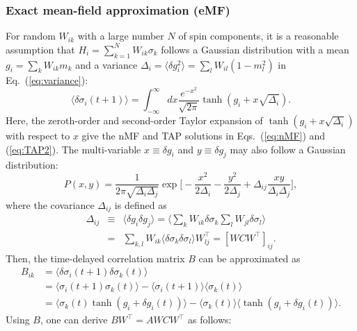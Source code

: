 \documentclass[prx,twocolumn,twoside,showpacs,superscriptaddress]{revtex4-1}
\begin{document}
\subsubsection*{Exact mean-field approximation (eMF)} 
For random $W_{ik}$ with a large number $N$ of spin components, it is a reasonable assumption that $H_i = \sum_{k=1}^N W_{ik} \sigma_k$ follows a Gaussian distribution with a mean $g_i = \sum_k W_{ik} m_k$ and a variance $\Delta_i = \langle \delta g_i^2 \rangle = \sum_l W_{il}(1-m_l^2)$ in Eq.~(\ref{eq:variance}):
\begin{equation}
\langle \delta \sigma_i(t+1) \rangle = \int_{-\infty}^{\infty} dx \frac{e^{-x^2}}{\sqrt{2 \pi}} \tanh (g_i + x \sqrt{\Delta_i}).
\end{equation}
Here, the zeroth-order and second-order Taylor expansion of $\tanh (g_i + x \sqrt{\Delta_i})$ with respect to $x$ give the nMF and TAP solutions in Eqs.~(\ref{eq:nMF}) and (\ref{eq:TAP2}).
The multi-variable $x \equiv \delta g_i$ and $y \equiv \delta g_j$ may also follow a Gaussian distribution:
\begin{equation}
P(x, y) = \frac{1}{2 \pi \sqrt{\Delta_i \Delta_j}} \exp \bigg[ - \frac{x^2}{2 \Delta_i} - \frac{y^2}{2 \Delta_j} + \Delta_{ij} \frac{xy}{\Delta_i \Delta_j}\bigg],
\end{equation}
where the covariance $\Delta_{ij}$ is defined as
\begin{eqnarray}
\Delta_{ij} &\equiv& \langle \delta g_i \delta g_j \rangle = \bigg\langle \sum_k W_{ik} \delta \sigma_k \sum_l W_{jl} \delta \sigma_l \bigg\rangle\nonumber \\
&=&\sum_{k,l} W_{ik} \langle \delta \sigma_k \delta \sigma_l \rangle W_{lj}^\top = [W C W^\top]_{ij}.
\end{eqnarray}
Then, the time-delayed correlation matrix $B$ can be approximated as
\begin{align}
B_{ik} &= \langle \delta \sigma_i(t+1) \delta \sigma_k(t) \rangle \nonumber \\
&= \langle \sigma_i(t+1) \sigma_k(t) \rangle - \langle \sigma_i(t+1) \rangle \langle \sigma_k(t) \rangle \nonumber \\
&= \langle \sigma_k(t) \tanh (g_i + \delta g_i(t)) \rangle - \langle \sigma_k(t) \rangle \langle \tanh (g_i + \delta g_i(t)) \rangle.
\end{align}
Using $B$, one can derive $BW^\top=AWCW^\top$ as follows:
\end{document}

